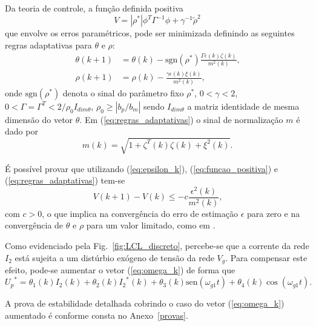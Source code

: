  Da teoria de controle, a função definida positiva
  \begin{equation}
    V = |\rho^*| \phi^T \Gamma^{-1} \phi + \gamma^{-1} {\tilde{\rho}}^2
    \label{eq:funcao_positiva}
  \end{equation}
  que envolve os erros paramétricos, pode ser minimizada definindo as seguintes regras adaptativas para $\theta$ e $\rho$:
  \begin{subequations}
    \begin{align}
      \theta(k + 1) & = \theta(k) - \text{sgn}(\rho^*)\frac{\Gamma \epsilon(k)\zeta(k)}{m^2(k)} \text{,}\\
      \rho(k + 1) & = \rho(k) - \frac{\gamma \epsilon(k) \xi(k)}{m^2(k)} \text{,}
    \end{align}
    \label{eq:regras_adaptativas}
  \end{subequations}
  onde $\text{sgn}(\rho^*)$ denota o sinal do parâmetro fixo $\rho^*$, $0 < \gamma < 2$, $0 < \Gamma = \Gamma^T < 2/\rho_0 I_{dim \theta}$, $\rho_0 \geq |b_p / b_m|$ sendo $I_{dim \theta}$ a matriz identidade de mesma dimensão do vetor $\theta$. Em (\ref{eq:regras_adaptativas}) o sinal de normalização $m$ é dado por
  \begin{equation}
    m(k) = \sqrt{1 + \zeta^T(k) \zeta(k) + \xi^2(k)} \text{.}
  \end{equation}

  É possível provar que utilizando (\ref{eq:epsilon_k}), (\ref{eq:funcao_positiva}) e (\ref{eq:regras_adaptativas}) tem-se
  \begin{equation}
    V(k + 1) - V(k) \leq -c \frac{\epsilon^2(k)}{m^2(k)} \text{,}
  \end{equation}
  com $c > 0$, o que implica na convergência do erro de estimação $\epsilon$ para zero e na convergência de $\theta$ e $\rho$ para um valor limitado, como em \cite{ref:TAO}.

  Como evidenciado pela Fig.~\ref{fig:LCL_discreto}, percebe-se que a corrente da rede $I_2$ está sujeita a um distúrbio exógeno de tensão da rede $V_g$. Para compensar este efeito, pode-se aumentar o vetor (\ref{eq:omega_k}) de forma que
  \begin{equation}
    {U_p}^* = \theta_1(k) I_2(k) + \theta_2(k) {I_2}^*(k)+
      \theta_3(k) \text{sen}(\omega_{g1}t) + \theta_4(k) \cos(\omega_{g1} t) \text{.}
  \end{equation}

  A prova de estabilidade detalhada cobrindo o caso do vetor (\ref{eq:omega_k}) aumentado é conforme consta no Anexo~\ref{provas}.



